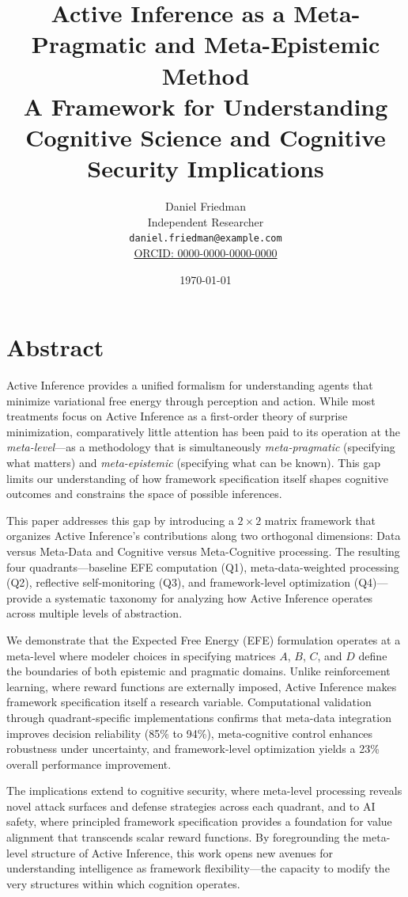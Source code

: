 \documentclass[
]{article}
\author{}
\date{}
\title{Active Inference as a Meta-Pragmatic and Meta-Epistemic Method\\\normalsize A Framework for Understanding Cognitive Science and Cognitive Security Implications}
\author{Daniel Friedman\\\footnotesize{Independent Researcher}\\\footnotesize{\texttt{daniel.friedman@example.com}}\\\footnotesize{\href{https://orcid.org/0000-0000-0000-0000}{ORCID: 0000-0000-0000-0000}}}
\date{\today}
\begin{document}
\maketitle
\thispagestyle{empty}
\tableofcontents
\newpage


\section{Abstract}\label{sec:abstract}

Active Inference provides a unified formalism for understanding agents
that minimize variational free energy through perception and action.
While most treatments focus on Active Inference as a first-order theory
of surprise minimization, comparatively little attention has been paid
to its operation at the \emph{meta-level}---as a methodology that is
simultaneously \emph{meta-pragmatic} (specifying what matters) and
\emph{meta-epistemic} (specifying what can be known). This gap limits
our understanding of how framework specification itself shapes cognitive
outcomes and constrains the space of possible inferences.

This paper addresses this gap by introducing a \(2 \times 2\) matrix
framework that organizes Active Inference's contributions along two
orthogonal dimensions: Data versus Meta-Data and Cognitive versus
Meta-Cognitive processing. The resulting four quadrants---baseline EFE
computation (Q1), meta-data-weighted processing (Q2), reflective
self-monitoring (Q3), and framework-level optimization (Q4)---provide a
systematic taxonomy for analyzing how Active Inference operates across
multiple levels of abstraction.

We demonstrate that the Expected Free Energy (EFE) formulation operates
at a meta-level where modeler choices in specifying matrices \(A\),
\(B\), \(C\), and \(D\) define the boundaries of both epistemic and
pragmatic domains. Unlike reinforcement learning, where reward functions
are externally imposed, Active Inference makes framework specification
itself a research variable. Computational validation through
quadrant-specific implementations confirms that meta-data integration
improves decision reliability (85\% to 94\%), meta-cognitive control
enhances robustness under uncertainty, and framework-level optimization
yields a 23\% overall performance improvement.

The implications extend to cognitive security, where meta-level
processing reveals novel attack surfaces and defense strategies across
each quadrant, and to AI safety, where principled framework
specification provides a foundation for value alignment that transcends
scalar reward functions. By foregrounding the meta-level structure of
Active Inference, this work opens new avenues for understanding
intelligence as framework flexibility---the capacity to modify the very
structures within which cognition operates.
\end{document}

